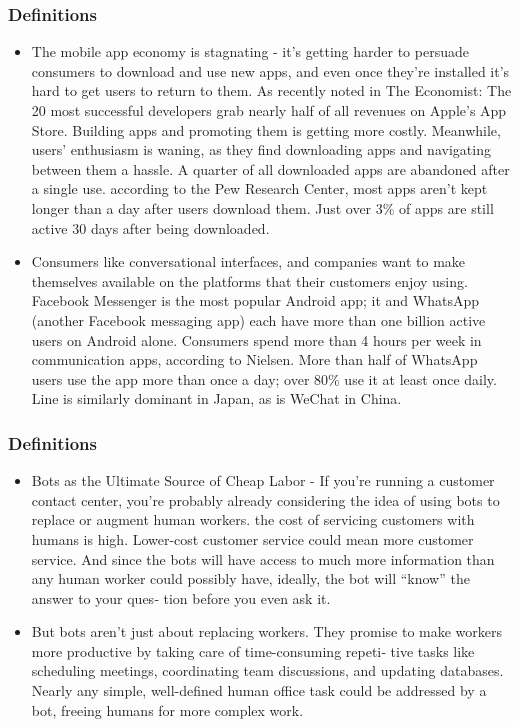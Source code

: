 \documentclass[11pt]{beamer}
\begin{document}
\begin{frame}
\frametitle{Definitions}
	\begin{itemize}
	\item The mobile app economy is stagnating - it’s getting harder to persuade consumers to download and use new apps, and even once they’re installed it’s hard to get users to return to them. As recently noted in The Economist: The 20 most successful developers grab nearly half of all revenues on Apple’s App Store. Building apps and promoting them is getting more costly. Meanwhile, users’ enthusiasm is waning, as they find downloading apps and navigating between them a hassle. A quarter of all downloaded apps are abandoned after a single use. according to the Pew Research Center, most apps aren’t kept longer than a day after users download them. Just over 3\% of apps are still active 30 days after being downloaded.
	\item Consumers like conversational interfaces, and companies want to make themselves available on the platforms that their customers enjoy using. Facebook Messenger is the most popular Android app; it and WhatsApp (another Facebook messaging app) each have more than one billion active users on Android alone. Consumers spend more than 4 hours per week in communication apps, according to Nielsen. More than half of WhatsApp users use the app more than once a day; over 80\% use it at least once daily. Line is similarly dominant in Japan, as is WeChat in China.
	\end{itemize}
\end{frame}

\begin{frame}
\frametitle{Definitions}
\begin{itemize}
	\item Bots as the Ultimate Source of Cheap Labor - If you’re running a customer contact center, you’re probably already considering the idea of using bots to replace or augment human workers. the cost of servicing customers with humans is high. Lower-cost customer service could mean more customer service. And since the bots will have access to much more information than any human worker could possibly have, ideally, the bot will “know” the answer to your ques‐ tion before you even ask it.
	\item But bots aren’t just about replacing workers. They promise to make workers more productive by taking care of time-consuming repeti‐ tive tasks like scheduling meetings, coordinating team discussions, and updating databases. Nearly any simple, well-defined human office task could be addressed by a bot, freeing humans for more complex work.
	\end{itemize}
\end{frame}
\end{document}
